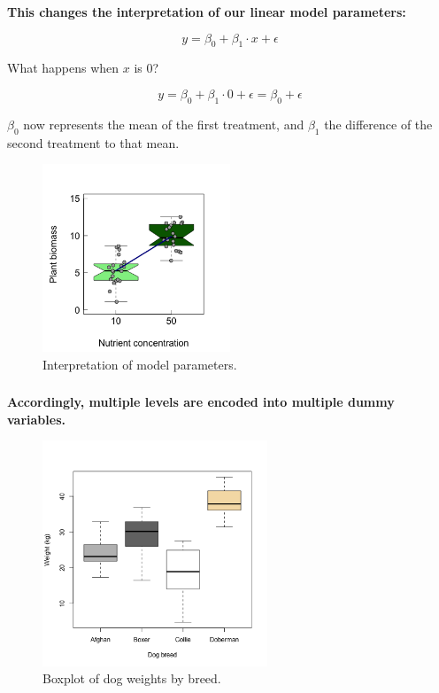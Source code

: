 \documentclass{beamer}
\begin{document}
\begin{frame}
  \frametitle{}
  \textbf{This changes the interpretation of our linear model parameters:}

  \begin{equation*}
  y = \beta_0 + \beta_1 \cdot x + \epsilon
  \end{equation*}
  
  What happens when $x$ is 0?
  
  \begin{equation*}
  y = \beta_0 + \beta_1 \cdot 0 + \epsilon = \beta_0 + \epsilon
  \end{equation*}
  
  $\beta_0$ now represents the mean of the first treatment, and $\beta_1$ the difference of the second treatment to that mean.
  
  \begin{figure}[h]
    \centering
    \includegraphics[width=0.5\textwidth]{lectures/day_3_LM_refresh_II/figures/unnamed-chunk-10-1.png} 
    \caption{Interpretation of model parameters.}
  \end{figure}
\end{frame}

\begin{frame}
  \frametitle{}
  \textbf{Accordingly, multiple levels are encoded into multiple dummy variables.}
  
  \begin{figure}[h]
    \centering
    \includegraphics[width=0.6\textwidth]{lectures/day_3_LM_refresh_II/figures/unnamed-chunk-12-1.png} 
    \caption{Boxplot of dog weights by breed.}
  \end{figure}
\end{frame}
\end{document}
